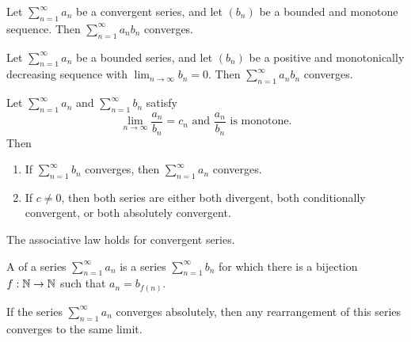 \begin{proposition}
  Let $\sum_{n = 1}^{\infty} a_n$ be a convergent series, and let
  $(b_n)$ be a bounded and monotone sequence. Then $\sum_{n =
  1}^{\infty} a_n b_n$ converges.
\end{proposition}

\begin{proposition}
  Let $\sum_{n = 1}^{\infty} a_n$ be a bounded series, and let
  $(b_n)$ be a positive and monotonically decreasing sequence with
  $\lim_{n \to \infty} b_n = 0$. Then $\sum_{n = 1}^{\infty} a_n b_n$ converges.
\end{proposition}

\begin{proposition}
  Let $\sum_{n = 1}^{\infty} a_n$ and $\sum_{n = 1}^{\infty} b_n$ satisfy
  \[ \text{$\lim_{n \to \infty} \frac{a_n}{b_n} = c_n$ and
  $\frac{a_n}{b_n}$ is monotone.} \]
  Then
  \begin{enumerate}
    \item If $\sum_{n = 1}^{\infty} b_n$ converges, then $\sum_{n =
      1}^{\infty} a_n$ converges.
    \item If $c \neq 0$, then both series are either both divergent,
      both conditionally convergent, or both absolutely convergent.
  \end{enumerate}
\end{proposition}

\begin{theorem}
  The associative law holds for convergent series.
\end{theorem}

\begin{definition}
  A  of a series $\sum_{n = 1}^{\infty} a_n$ is
  a series $\sum_{n = 1}^{\infty} b_n$ for which there is a bijection
  $f : \mathbb N \to \mathbb N$ such that $a_n = b_{f(n)}$.
\end{definition}

\begin{theorem}
  If the series $\sum_{n = 1}^{\infty} a_n$ converges absolutely,
  then any rearrangement of this series converges to the same limit.
\end{theorem}

